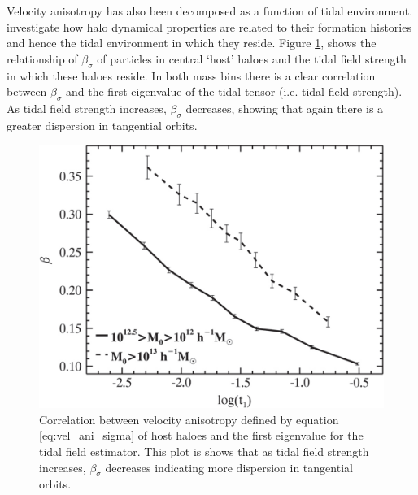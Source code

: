 Velocity anisotropy has also been decomposed as a function of tidal environment. \cite{shi2015} investigate how halo dynamical properties are related to their formation histories and hence the tidal environment in which they reside. Figure \ref{fig:shifig11}, shows the relationship of $\beta_{\sigma}$ of particles in central `host' haloes and the tidal field strength in which these haloes reside. In both mass bins there is a clear correlation between $\beta_{\sigma}$ and the first eigenvalue of the tidal tensor (i.e. tidal field strength). As tidal field strength increases, $\beta_{\sigma}$ decreases, showing that again there is a greater dispersion in tangential orbits. 
\begin{figure}
\begin{center}
	\includegraphics[width=0.5\linewidth]{thesis/latex/dyn_mod_files/shi2015fig11.jpg}
    \caption{Correlation between velocity anisotropy defined by equation \ref{eq:vel_ani_sigma} of host haloes and the first eigenvalue for the tidal field estimator. This plot is shows that as tidal field strength increases, $\beta_{\sigma}$ decreases indicating more dispersion in tangential orbits.}
    \label{fig:shifig11}
\end{center}
\end{figure}

